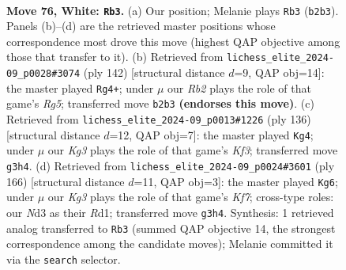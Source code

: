 \documentclass[11pt]{article}
\begin{document}
\clearpage

\begin{figure}[p]\centering
\begin{subfigure}{0.46\textwidth}\centering
\resizebox{\linewidth}{!}{%
\newchessgame
\chessboard[
  setfen={8/8/k7/8/8/3N2K1/1R4P1/3r4 w - - 16 76},
  showmover=false,
  pgfstyle=straightmove, color=movearrow, markmove={b2-b3}
]}
\caption{}
\end{subfigure}\hfill
\begin{subfigure}{0.46\textwidth}\centering
\resizebox{\linewidth}{!}{%
\newchessgame
\chessboard[
  setfen={8/8/7K/5NRP/1k6/8/5r2/8 w - - 11 72},
  showmover=false,
  pgfstyle=straightmove, color=movearrow, markmove={g5-g4}
]}
\caption{}
\end{subfigure}
\\[4pt]
\begin{subfigure}{0.46\textwidth}\centering
\resizebox{\linewidth}{!}{%
\newchessgame
\chessboard[
  setfen={4k3/7R/8/r5N1/5P2/5K2/8/8 w - - 9 69},
  showmover=false,
  pgfstyle=straightmove, color=movearrow, markmove={f3-g4}
]}
\caption{}
\end{subfigure}\hfill
\begin{subfigure}{0.46\textwidth}\centering
\resizebox{\linewidth}{!}{%
\newchessgame
\chessboard[
  setfen={8/2k1PK2/4R3/8/5r2/8/8/3R4 w - - 3 84},
  showmover=false,
  pgfstyle=straightmove, color=movearrow, markmove={f7-g6}
]}
\caption{}
\end{subfigure}
\caption{\textbf{Move 76, White: \texttt{Rb3}.} (a) Our position; Melanie plays \texttt{Rb3} (\texttt{b2b3}). Panels (b)--(d) are the retrieved master positions whose correspondence most drove this move (highest QAP objective among those that transfer to it). (b) Retrieved from \texttt{lichess\_elite\_2024-09\_p0028\#3074} (ply 142) [structural distance $d$=9, QAP obj=14]: the master played \texttt{Rg4+}; under $\mu$ our \emph{Rb2} plays the role of that game's \emph{Rg5}; transferred move \texttt{b2b3} \textbf{(endorses this move)}. (c) Retrieved from \texttt{lichess\_elite\_2024-09\_p0013\#1226} (ply 136) [structural distance $d$=12, QAP obj=7]: the master played \texttt{Kg4}; under $\mu$ our \emph{Kg3} plays the role of that game's \emph{Kf3}; transferred move \texttt{g3h4}. (d) Retrieved from \texttt{lichess\_elite\_2024-09\_p0024\#3601} (ply 166) [structural distance $d$=11, QAP obj=3]: the master played \texttt{Kg6}; under $\mu$ our \emph{Kg3} plays the role of that game's \emph{Kf7}; cross-type roles: our \emph{N}d3 as their \emph{R}d1; transferred move \texttt{g3h4}. Synthesis: 1 retrieved analog transferred to \texttt{Rb3} (summed QAP objective 14, the strongest correspondence among the candidate moves); Melanie committed it via the \texttt{search} selector.}
\label{fig:thought-m150}
\end{figure}
\end{document}
